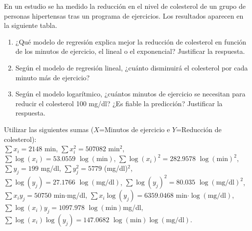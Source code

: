 \documentclass[aspectratio=149,10pt,t]{beamer}
\begin{document}
\begin{frame}[c]
	En un estudio se ha medido la reducción en el nivel de colesterol de un grupo de personas hipertensas tras un programa de ejercicios.
	Los resultados aparecen en la siguiente tabla.

	\medskip


	\begin{enumerate}
	  \item ¿Qué modelo de regresión explica mejor la reducción de colesterol en función de los minutos de ejercicio, el lineal o el exponencial? Justificar la respuesta.
	  \item Según el modelo de regresión lineal, ¿cuánto disminuirá el colesterol por cada minuto más de ejercicio?
	  \item Según el modelo logarítmico, ¿cuántos minutos de ejercicio se necesitan para reducir el colesterol 100 mg/dl?
	  ¿Es fiable la predicción?
	  Justificar la respuesta.
	\end{enumerate}

	Utilizar las siguientes sumas ($X$=Minutos de ejercicio e $Y$=Reducción de colesterol):\\
	 $\sum x_i=2148$ min, $\sum x_i^2=507082$ min$^2$,\\
	 $\sum \log(x_i)=53.0559$ $\log(\mbox{min})$, $\sum \log(x_i)^2=282.9578$ $\log(\mbox{min})^2$, \\
	 $\sum y_j=199$ mg/dl, $\sum y_j^2=5779$ (mg/dl)$^2$,\\
	 $\sum \log(y_j)=27.1766$ $\log(\mbox{mg/dl})$, $\sum \log(y_j)^2=80.035$ $\log(\mbox{mg/dl})^2$,\\
	 $\sum x_iy_j=50750$ min$\cdot$mg/dl, $\sum x_i\log(y_j)=6359.0468$ min$\cdot\log(\mbox{mg/dl})$, $\sum \log(x_i)y_j=1097.978$ $\log(\mbox{min})$mg/dl, $\sum \log(x_i)\log(y_j)=147.0682$ $\log(\mbox{min})\log(\mbox{mg/dl})$.
\end{frame}
\end{document}
